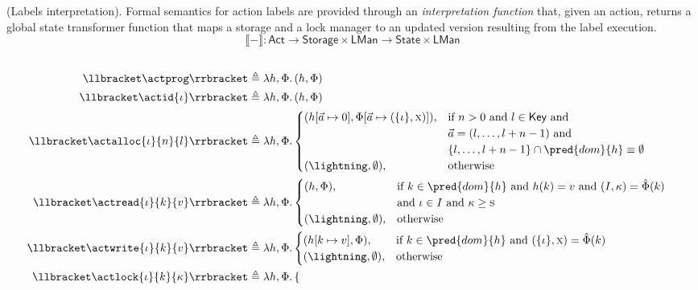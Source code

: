 \begin{defn}
	(Labels interpretation).
	Formal semantics for action labels are provided through an \emph{interpretation function} that, given an action, returns a global state transformer function that maps a storage and a lock manager to an updated version resulting from the label execution.
	\[
		\llbracket - \rrbracket
			:
		\mathsf{Act} \rightarrow
		\mathsf{Storage} \times \mathsf{LMan} \rightarrow
		\mathsf{State} \times \mathsf{LMan}
	\]
	\begin{align*}\\
		\llbracket \actprog \rrbracket &\triangleq \lambda h, \Phi \ldotp (h,\Phi) \\
		\llbracket \actid{\iota} \rrbracket &\triangleq \lambda h, \Phi \ldotp (h,\Phi) \\
		\llbracket \actalloc{\iota}{n}{l} \rrbracket &\triangleq \lambda h, \Phi \ldotp
			\begin{cases}
				(h[\vec{a} \mapsto 0], \Phi[\vec{a} \mapsto (\{ \iota \}, \textsc{x})]),
				&
				\text{if } n > 0 \text{ and } l \in \mathsf{Key} \text{ and } \\
				& \vec{a} = (l, \ldots, l + n - 1) \text{ and } \\
				& \{ l, \ldots, l + n - 1 \} \cap \pred{dom}{h} \equiv \emptyset \\
				(\lightning, \emptyset), & \text{otherwise}
			\end{cases}
	\\
	\llbracket \actread{\iota}{k}{v} \rrbracket &\triangleq \lambda h, \Phi \ldotp
	\begin{cases}
	(h, \Phi), & \text{if } k \in \pred{dom}{h} \text{ and } h(k) = v \text{ and } (I, \kappa) = \hat{\Phi}(k) \\ & \text{and } \iota \in I \text{ and } \kappa \geq \textsc{s} \\
	(\lightning, \emptyset), & \text{otherwise}
	\end{cases} \\
	\llbracket \actwrite{\iota}{k}{v} \rrbracket &\triangleq \lambda h, \Phi \ldotp
	\begin{cases}
	(h[k \mapsto v], \Phi), & \text{if } k \in \pred{dom}{h} \text{ and } (\{\iota\}, \textsc{x}) = \hat{\Phi}(k) \\
	(\lightning, \emptyset), & \text{otherwise}
	\end{cases} \\
	\llbracket \actlock{\iota}{k}{\kappa} \rrbracket &\triangleq \lambda h, \Phi \ldotp
	\begin{cases}

\end{cases}
\end{align*}
\end{defn}
